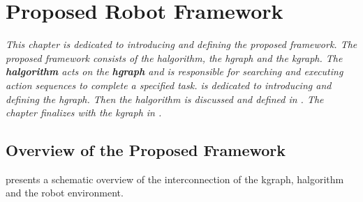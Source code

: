 
 
\chapter{Proposed Robot Framework}%
\label{chap:hgraph_and_kgraph}
\textit{This chapter is dedicated to introducing and defining the proposed framework. The proposed framework consists of the \acl{halgorithm}, the \acl{hgraph} and the \acl{kgraph}. The \textbf{\acf{halgorithm}} acts on the \textbf{\acf{hgraph}} and is responsible for searching and executing action sequences to complete a specified task.  is dedicated to introducing and defining the \ac{hgraph}. Then the \ac{halgorithm} is discussed and defined in . The chapter finalizes with the \ac{kgraph} in .\bs}

\section{Overview of the Proposed Framework}
 presents a schematic overview of the interconnection of the \ac{kgraph}, \ac{halgorithm} and the robot environment.\bs

